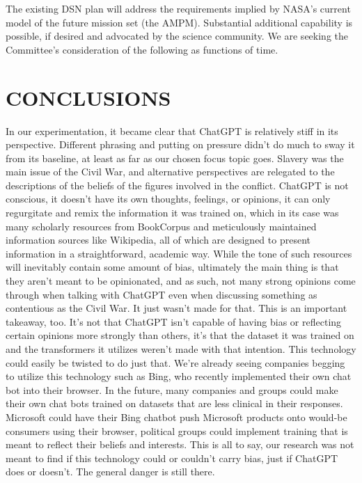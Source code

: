 \documentclass[letterpaper, 10 pt, conference]{ieeeconf}  %
\begin{document}
The existing DSN plan will address the requirements implied by NASA’s current model of the
future mission set (the AMPM). Substantial additional capability is possible, if desired and advocated
by the science community. We are seeking the Committee’s consideration of the following
as functions of time.

\section{CONCLUSIONS}

In our experimentation, it became clear that ChatGPT is relatively stiff in its perspective. Different phrasing and putting on pressure didn’t do much to sway it from its baseline, at least as far as our chosen focus topic goes. Slavery was the main issue of the Civil War, and alternative perspectives are relegated to the descriptions of the beliefs of the figures involved in the conflict. ChatGPT is not conscious, it doesn’t have its own thoughts, feelings, or opinions, it can only regurgitate and remix the information it was trained on, which in its case was many scholarly resources from BookCorpus and meticulously maintained information sources like Wikipedia, all of which are designed to present information in a straightforward, academic way. While the tone of such resources will inevitably contain some amount of bias, ultimately the main thing is that they aren’t meant to be opinionated, and as such, not many strong opinions come through when talking with ChatGPT even when discussing something as contentious as the Civil War. It just wasn’t made for that.
	This is an important takeaway, too. It’s not that ChatGPT isn’t capable of having bias or reflecting certain opinions more strongly than others, it’s that the dataset it was trained on and the transformers it utilizes weren’t made with that intention. This technology could easily be twisted to do just that. We’re already seeing companies begging to utilize this technology such as Bing, who recently implemented their own chat bot into their browser. In the future, many companies and groups could make their own chat bots trained on datasets that are less clinical in their responses. Microsoft could have their Bing chatbot push Microsoft products onto would-be consumers using their browser, political groups could implement training that is meant to reflect their beliefs and interests. This is all to say, our research was not meant to find if this technology could or couldn’t carry bias, just if ChatGPT does or doesn’t. The general danger is still there.
\end{document}
